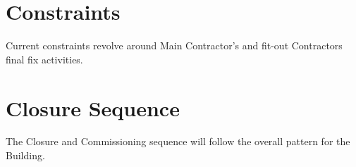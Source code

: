 \section{Constraints}
Current constraints revolve around Main Contractor's and fit-out Contractors final fix activities. 

\section{Closure Sequence}

The Closure and Commissioning sequence will follow the overall pattern for the Building. 
\bigskip



